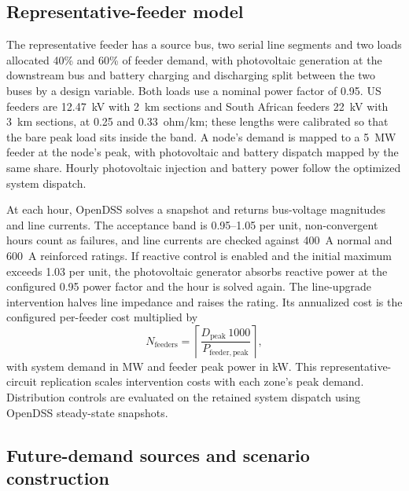 \documentclass[pdflatex,sn-nature]{sn-jnl}
\begin{document}
\subsection{Representative-feeder model}

The representative feeder has a source bus, two serial line segments and two loads allocated 40\% and 60\% of feeder demand, with photovoltaic generation at the downstream bus and battery charging and discharging split between the two buses by a design variable. Both loads use a nominal power factor of 0.95. US feeders are 12.47~kV with 2~km sections and South African feeders 22~kV with 3~km sections, at 0.25 and 0.33~ohm/km; these lengths were calibrated so that the bare peak load sits inside the band. A node's demand is mapped to a 5~MW feeder at the node's peak, with photovoltaic and battery dispatch mapped by the same share. Hourly photovoltaic injection and battery power follow the optimized system dispatch.

At each hour, OpenDSS solves a snapshot and returns bus-voltage magnitudes and line currents. The acceptance band is 0.95--1.05 per unit, non-convergent hours count as failures, and line currents are checked against 400~A normal and 600~A reinforced ratings. If reactive control is enabled and the initial maximum exceeds 1.03 per unit, the photovoltaic generator absorbs reactive power at the configured 0.95 power factor and the hour is solved again. The line-upgrade intervention halves line impedance and raises the rating. Its annualized cost is the configured per-feeder cost multiplied by
\begin{equation}
N_{\mathrm{feeders}}=\left\lceil\frac{D_{\mathrm{peak}}\,1000}
{P_{\mathrm{feeder,peak}}}\right\rceil,
\end{equation}
with system demand in MW and feeder peak power in kW. This representative-circuit replication scales intervention costs with each zone's peak demand. Distribution controls are evaluated on the retained system dispatch using OpenDSS steady-state snapshots\cite{epriopendss}.

\subsection{Future-demand sources and scenario construction}\label{sec:demand-scenarios}
\end{document}
